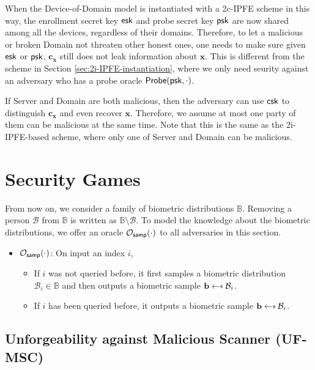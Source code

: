 When the Device-of-Domain model is instantiated with a 2c-IPFE scheme in this way, the enrollment secret key ${\sf esk}$ and probe secret key ${\sf psk}$ are now shared among all the devices, regardless of their domains. Therefore, to let a malicious or broken {\sf Domain} not threaten other honest ones, one needs to make sure given ${\sf esk}$ or ${\sf psk}$, $\mathbf{c_x}$ still does not leak information about $\mathbf{x}$. This is different from the scheme in Section \ref{sec:2i-IPFE-instantiation}, where we only need seurity against an adversary who has a probe oracle ${\sf Probe}({\sf psk}, \cdot)$.

If {\sf Server} and {\sf Domain} are both malicious, then the adversary can use ${\sf csk}$ to distinguish $\mathbf{c_x}$ and even recover $\mathbf{x}$. Therefore, we assume at most one party of them can be malicious at the same time. Note that this is the same as the 2i-IPFE-based scheme, where only one of {\sf Server} and {\sf Domain} can be malicious.



\section{Security Games}

From now on, we consider a family of biometric distributions $\mathbb{B}$. Removing a person $\mathcal{B}$ from $\mathbb{B}$ is written as $\mathbb{B} \setminus \mathcal{B}$. To model the knowledge about the biometric distributions, we offer an oracle $\mathcal{O}_{\sf samp}(\cdot)$ to all adversaries in this section.

\begin{itemize}
	\item $\mathcal{O}_{\sf samp}(\cdot)$: On input an index $i$,
	\begin{itemize}
		\item If $i$ was not queried before, it first samples a biometric distribution $\mathcal{B}_i \in \mathbb{B}$ and then outputs a biometric sample $\mathbf{b} \getsdollar \mathcal{B}_i$.
		\item If $i$ has been queried before, it outputs a biometric sample $\mathbf{b} \getsdollar \mathcal{B}_i$.
	\end{itemize}
\end{itemize}



\subsection{Unforgeability against Malicious Scanner (\textsf{UF-MSC})}
\label{sec:uf-msc_game}

